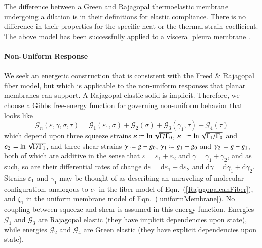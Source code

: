 The difference between a Green and Rajagopal thermo\-elastic membrane under\-going a dilation is in their definitions for elastic compliance.  There is no difference in their properties for the specific heat or the thermal strain coefficient.  The above model has been successfully applied to a visceral pleura membrane \cite{Freedetal17}.

\paragraph{Non-Uniform Response}

We seek an energetic construction that is consistent with the Freed \& Rajagopal \cite{FreedRajagopal16} fiber model, but which is applicable to the non-uniform responses that planar membranes can support.  A Rajagopal elastic solid is implicit. Therefore, we choose a Gibbs free-energy function for governing non-uniform behavior that looks like
\begin{equation}
\mathcal{G}_n ( \varepsilon , \gamma , \sigma , \tau ) = \mathcal{G}_1 ( \varepsilon_1 , \sigma ) + \mathcal{G}_2 ( \sigma ) + \mathcal{G}_3 ( \gamma_1 , \tau ) + \mathcal{G}_4 ( \tau )
\label{nonuniformEnergy}
\end{equation}
which depend upon three squeeze strains $\varepsilon \defeq \ln \sqrt{\Gamma \! / \Gamma_0}$, $\varepsilon_1 \defeq \ln \sqrt{ \Gamma_1 / \Gamma_0}$ and $\varepsilon_2 \defeq \ln \sqrt{ \Gamma \! / \Gamma_1}$, and three shear strains $\gamma \defeq g - g_0$, $\gamma_1 \defeq g_1 - g_0$ and $\gamma_2 \defeq g - g_1$, both of which are additive in the sense that $\varepsilon = \varepsilon_1 + \varepsilon_2$ and $\gamma = \gamma_1 + \gamma_2$, and as such, so are their differential rates of change $\mathrm{d} \varepsilon = \mathrm{d} \varepsilon_1 + \mathrm{d} \varepsilon_2$ and $\mathrm{d} \gamma = \mathrm{d} \gamma_1 + \mathrm{d} \gamma_2$.  Strains $\varepsilon_1$ and $\gamma_1$ may be thought of as describing an unraveling of molecular configuration, analogous to $e_1$ in the fiber model of Eqn.~(\ref{RajagopaleanFiber}), and $\xi_1$ in the uniform membrane model of Eqn.~(\ref{uniformMembrane}).  No coupling between squeeze and shear is assumed in this energy function.  Energies $\mathcal{G}_1$ and $\mathcal{G}_3$ are Rajagopal elastic (they have implicit dependencies upon state), while energies $\mathcal{G}_2$ and $\mathcal{G}_4$ are Green elastic (they have explicit dependencies upon state).

